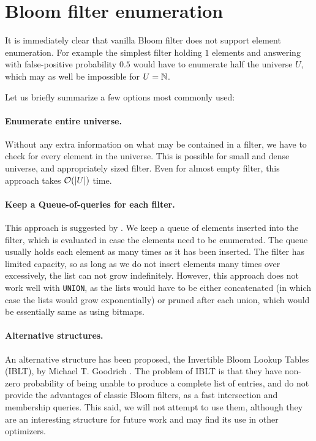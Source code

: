 \section{Bloom filter enumeration}

It is immediately clear that vanilla Bloom filter does not support element
enumeration. For example the simplest filter holding $1$ elements and
answering with false-positive probability $0.5$ would have to enumerate half the
universe $U$, which may as well be impossible for $U=\mathbb{N}$.

Let us briefly summarize a few options most commonly used:

\paragraph{Enumerate entire universe.} Without any extra information on what
may be contained in a filter, we have to check for every element in the
universe. This is possible for small and dense universe, and appropriately sized filter.
Even for almost empty filter, this approach takes $\mathcal{O}(|U|)$ time.

\paragraph{Keep a Queue-of-queries for each filter.} This approach is suggested
by \cite{Jeffrey2011}. We keep a queue of elements inserted into the filter,
which is evaluated in case the elements need to be enumerated. The queue usually
holds each element as many times as it has been inserted. The filter has
limited capacity, so as long as we do not insert elements many times over
excessively, the list can not grow indefinitely. However, this approach does not
work well with {\tt UNION}, as the lists would have to be either concatenated
(in which case the lists would grow exponentially) or pruned after each union,
which would be essentially same as using bitmaps.

\paragraph{Alternative structures.} An alternative structure has been proposed,
the Invertible Bloom
Lookup Tables (IBLT), by Michael T. Goodrich \cite{goodrich:2011}. The problem of IBLT is
that they have non-zero probability of being unable to produce a complete list
of entries, and do not provide the advantages of classic Bloom filters, as a
fast intersection and membership queries. This said, we will not attempt to use
them, although they are an interesting structure for future work and may find
its use in other optimizers.

